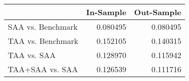 \begin{tabular}{lrr}
\toprule
{} &  In-Sample &  Out-Sample \\
\midrule
SAA vs. Benchmark &   0.080495 &    0.080495 \\
TAA vs. Benchmark &   0.152105 &    0.140315 \\
TAA vs. SAA       &   0.128970 &    0.115942 \\
TAA+SAA vs. SAA   &   0.126539 &    0.111716 \\
\bottomrule
\end{tabular}
